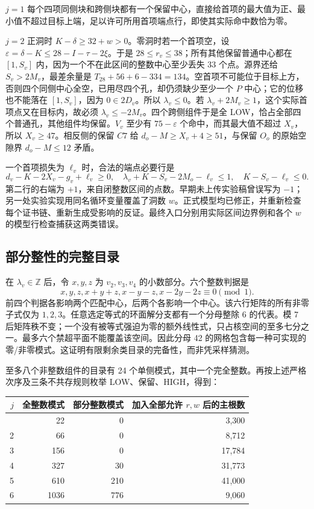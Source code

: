 \documentclass[11pt,a4paper]{article}
\begin{document}
\(j=1\)
每个四项同侧块和跨侧块都有一个保留中心，直接给首项的最大值为正、最小值不超过目标上端，足以许可所用首项端点行，即使其实际命中数恰为零。

\(j=2\) 正洞时 \(K-\delta\ge32+w>0\)。零洞时若一个首项空，设
\(\varepsilon=\delta-K\le28-I-\tau-2\xi\)。于是
\(28\le r_v\le38\)；所有其他保留普通中心都在 \([1,S_v]\)
内，因为一个不在此区间的整数中心至少丢失 33 个点。源界还给
\(S_v>2M_v\)，最差余量是
\(T_{28}+56+6-334=134\)。空首项不可能位于目标上方，否则四个同侧中心全空，已用尽四个孔，却仍须缺少至少一个
\(P\) 中心；它的位移也不能落在 \([1,S_v]\)，因为 \(0\in2D_v\)。所以
\(\lambda_v\le0\)。若
\(\lambda_v+2M_v\ge1\)，这个实际首项点又在目标内，故必须
\(\lambda_v\le-2M_v\)。四个跨侧组件于是全
LOW，恰占全部四个普通孔，其他组件均保留。\(V_v\) 至少有
\(75-\varepsilon\) 个命中，而其最大值不超过 \(X_v\)，所以
\(X_v\ge47\)。相反侧的保留 \(C7\) 给 \(d_o-M\ge X_v+4\ge51\)，与保留
\(O_o\) 的原始空隙界 \(d_o-M\le12\) 矛盾。

一个首项损失为 \(\ell_v\) 时，合法的端点必要行是 \[
 d_v-K-2X_v-g_v+\ell_v\ge0,
 \quad \lambda_v+K-S_v-2M_o-\ell_v\le1,
 \quad K-S_v-\ell_v\le0.
\] 第二行的右端为
\textbf{\(+1\)}，来自闭整数区间的点数。早期未上传实验稿曾误写为
\(-1\)；另一处实验实现用同名循环变量覆盖了洞数
\(w\)。正式模型均已修正，并重新检查每个证书链、重新生成受影响的反证。最终入口分别用实际区间边界例和各个
\(w\) 的模型行检查捕获这两类错误。

\hypertarget{ux90e8ux5206ux6574ux6027ux7684ux5b8cux6574ux76eeux5f55}{%
\subsection{部分整性的完整目录}\label{ux90e8ux5206ux6574ux6027ux7684ux5b8cux6574ux76eeux5f55}}

在 \(\lambda_v\in\mathbb Z\) 后，令 \(x,y,z\) 为 \(v_2,v_3,v_4\)
的小数部分。六个整数判据是 \[
 x, y, z, x+y+z, x-y-z, x-2y-2z\equiv0\pmod1.
\]
前四个判据各影响两个匹配中心，后两个各影响一个中心。该六行矩阵的所有非零子式仅为
\(1,2,3\)。任意选定等式的环面解分支都有一个分母整除 6 的代表。模 7
后矩阵秩不变；一个没有被等式强迫为零的额外线性式，只占核空间的至多七分之一。最多六个禁超平面不能覆盖该空间。因此分母
42
的网格包含每一种可实现的零/非零模式。这证明有限剩余类目录的完备性，而非凭采样猜测。

至多八个非整数组件的目录有 24
个单侧模式，其中一个完全整数。再按上述严格次序及三条不共存规则枚举
LOW、保留、HIGH，得到：

\begin{longtable}[]{@{}rrrr@{}}
\toprule\noalign{}
\(j\) & 全整数模式 & 部分整数模式 & 加入全部允许 \(r,w\) 后的主根数 \\
\midrule\noalign{}
\endhead
\bottomrule\noalign{}
\endlastfoot
1 & 22 & 0 & 3,300 \\
2 & 66 & 0 & 8,712 \\
3 & 156 & 0 & 17,784 \\
4 & 327 & 30 & 31,773 \\
5 & 610 & 210 & 41,000 \\
6 & 1036 & 776 & 9,060 \\
\end{longtable}
\end{document}
